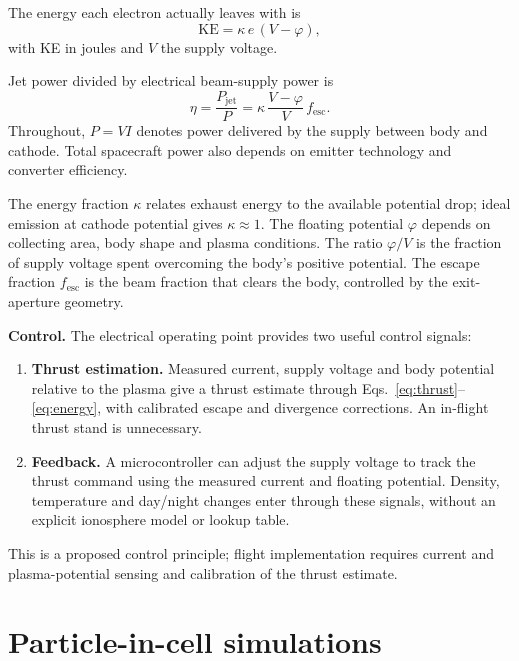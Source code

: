 \documentclass[11pt,twocolumn]{article}
\newcommand{\fesc}{f_{\mathrm{esc}}}
\begin{document}
The energy each electron actually leaves with is
\begin{equation}
\mathrm{KE} = \kappa\,e\,(V-\varphi),
\label{eq:energy}
\end{equation}
with KE in joules and $V$ the supply voltage.

Jet power divided by electrical beam-supply power is
\begin{equation}
\eta = \frac{P_{\mathrm{jet}}}{P}
     = \kappa\,\frac{V-\varphi}{V}\,\fesc.
\label{eq:efficiency}
\end{equation}
Throughout, $P = VI$ denotes power delivered by the supply between body and cathode. Total spacecraft power also depends on emitter technology and converter efficiency.

The energy fraction $\kappa$ relates exhaust energy to the available potential drop; ideal emission at cathode potential gives $\kappa \approx 1$. The floating potential $\varphi$ depends on collecting area, body shape and plasma conditions. The ratio $\varphi/V$ is the fraction of supply voltage spent overcoming the body's positive potential. The escape fraction $\fesc$ is the beam fraction that clears the body, controlled by the exit-aperture geometry.

\noindent\textbf{Control.} The electrical operating point provides two useful control signals:
\begin{enumerate}\setlength{\itemsep}{1pt}\setlength{\parskip}{0pt}
  \item \textbf{Thrust estimation.} Measured current, supply voltage and body potential relative to the plasma give a thrust estimate through Eqs.~\ref{eq:thrust}--\ref{eq:energy}, with calibrated escape and divergence corrections. An in-flight thrust stand is unnecessary.
  \item \textbf{Feedback.} A microcontroller can adjust the supply voltage to track the thrust command using the measured current and floating potential. Density, temperature and day/night changes enter through these signals, without an explicit ionosphere model or lookup table.
\end{enumerate}
This is a proposed control principle; flight implementation requires current and plasma-potential sensing and calibration of the thrust estimate.
\par\endgroup

\section{Particle-in-cell simulations}
\end{document}
